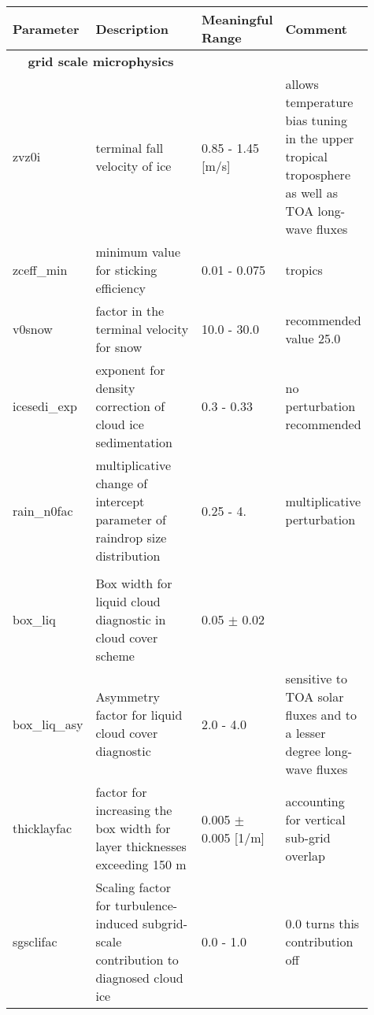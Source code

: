 \documentclass[11pt]{article}
\begin{document}

   \begin{center}
   \begin{tabular}{p{0.15\linewidth}p{0.35\linewidth}p{0.18\linewidth}p{0.23\linewidth}}  
     \toprule
      Parameter    & Description & Meaningful Range& Comment\\
     \midrule
     \multicolumn{2}{c}{\bf grid scale microphysics}\\ \cmidrule{1-2}
      \rowcolor[rgb]{0.8,0.8,1.}zvz0i   & terminal fall velocity of ice   & 0.85 - 1.45 [m/s] 
         &allows temperature bias tuning in the upper tropical troposphere as well as TOA long-wave fluxes\\
      \rowcolor[rgb]{0.8,0.8,1.}zceff\_min  & minimum value for sticking efficiency& 0.01 - 0.075 &tropics\\
      \rowcolor[rgb]{0.8,1,0.8}v0snow    & factor in the terminal velocity for snow & 10.0 - 30.0 & recommended value 25.0\\
      icesedi\_exp & exponent for density correction of cloud ice sedimentation & 0.3 -  0.33 &no perturbation recommended \\
      \rowcolor[rgb]{0.8,1,0.8}rain\_n0fac & multiplicative change of intercept parameter of raindrop size distribution & 0.25 - 4. & multiplicative perturbation \\
     \addlinespace[10pt] 
     \multicolumn{2}{c}{\bf cloud cover}\\ \cmidrule{1-2}
      box\_liq   & Box width for liquid cloud diagnostic in cloud cover scheme & 0.05 $\pm$ 0.02 &\\
      box\_liq\_asy & Asymmetry factor for liquid cloud cover diagnostic & 2.0 - 4.0 & sensitive to TOA solar fluxes and to a lesser degree long-wave fluxes\\
      thicklayfac & factor for increasing the box width for layer thicknesses exceeding 150 m & 0.005 $\pm$ 0.005 [1/m] & accounting for vertical sub-grid overlap\\
      sgsclifac & Scaling factor for turbulence-induced subgrid-scale contribution to diagnosed cloud ice & 0.0 - 1.0 & 0.0 turns this contribution off\\
     \bottomrule
   \end{tabular}
   \end{center}

\end{document}

